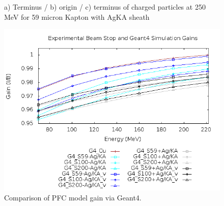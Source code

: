 \documentclass{article}
\begin{document}
\begin{figure}[H]
\centering
{}
\caption{a) Terminus / b) origin / c) terminus of charged particles at 250 MeV for 59 micron Kapton with AgKA sheath}
\label{fig:G4_stats_AgKA}
\end{figure}

\begin{figure}[H]
  \centering
  \includegraphics[width=5in]{figures/fig_G4_results.png}
  \caption{Comparison of PFC model gain via Geant4.} 
  \label{fig:G4_results}
\end{figure}
\end{document}
